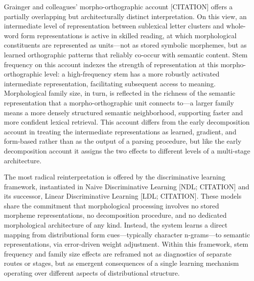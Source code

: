 \documentclass[utf8]{FrontiersinHarvard} %
\begin{document}
Grainger and colleagues' morpho-orthographic account [CITATION] offers a partially overlapping but architecturally distinct interpretation. On this view, an intermediate level of representation between sublexical letter clusters and whole-word form representations is active in skilled reading, at which morphological constituents are represented as units—not as stored symbolic morphemes, but as learned orthographic patterns that reliably co-occur with semantic content. Stem frequency on this account indexes the strength of representation at this morpho-orthographic level: a high-frequency stem has a more robustly activated intermediate representation, facilitating subsequent access to meaning. Morphological family size, in turn, is reflected in the richness of the semantic representation that a morpho-orthographic unit connects to—a larger family means a more densely structured semantic neighborhood, supporting faster and more confident lexical retrieval. This account differs from the early decomposition account in treating the intermediate representations as learned, gradient, and form-based rather than as the output of a parsing procedure, but like the early decomposition account it assigns the two effects to different levels of a multi-stage architecture.

The most radical reinterpretation is offered by the discriminative learning framework, instantiated in Naive Discriminative Learning [NDL; CITATION] and its successor, Linear Discriminative Learning [LDL; CITATION]. These models share the commitment that morphological processing involves no stored morpheme representations, no decomposition procedure, and no dedicated morphological architecture of any kind. Instead, the system learns a direct mapping from distributional form cues—typically character n-grams—to semantic representations, via error-driven weight adjustment. Within this framework, stem frequency and family size effects are reframed not as diagnostics of separate routes or stages, but as emergent consequences of a single learning mechanism operating over different aspects of distributional structure.
\end{document}
